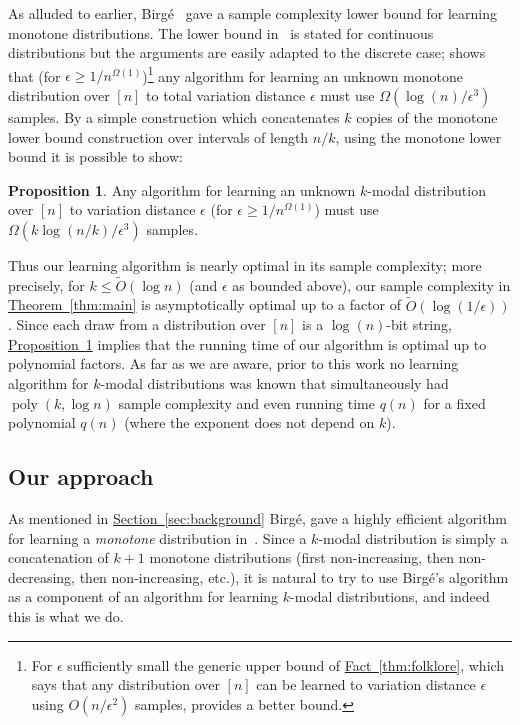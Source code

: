 \documentclass[10pt]{article}
\theoremstyle{definition}
\newtheorem{proposition}[theorem]{Proposition}
\numberwithin{equation}{section}
\newcommand{\expref}[2]{\texorpdfstring{\hyperref[#2]{#1~\ref{#2}}}{#1~\ref{#2}}}
\newcommand{\eps}{\epsilon}
\newcommand{\poly}{\operatorname{poly}}
\begin{document}
%

As alluded to earlier, Birg\'{e}~\cite{Birge:87} gave a sample complexity lower bound
for learning monotone distributions. The lower bound in~\cite{Birge:87} is stated for continuous
distributions but the arguments are easily adapted to the discrete case; \cite{Birge:87} shows that
(for $\eps \geq 1/n^{\Omega(1)}$)\footnote{For $\eps$ sufficiently small the generic
upper bound of  {\expref{Fact}{thm:folklore}}, which says that any distribution over $[n]$
can be learned to variation distance $\eps$ using $O(n/\eps^2)$ samples, provides a
better bound.} any algorithm for learning an unknown monotone distribution over $[n]$ to
total variation distance $\eps$ must use $\Omega(\log(n)/\eps^3)$ samples.
By a simple construction which concatenates $k$ copies of the monotone lower bound construction over intervals
of length $n/k$, using the monotone lower bound it is possible to show:

%

\begin{proposition} \label{obs:lowerbound}
Any algorithm for learning an unknown $k$-modal distribution over $[n]$ to variation distance
$\eps$ (for $\eps \geq 1/n^{\Omega(1)}$) must use $\Omega(k \log(n/k)/\eps^3)$ samples.
\end{proposition}

%

Thus our learning algorithm is nearly optimal in its sample complexity; more precisely,
for $k \leq \tilde{O}( {\log n})$ (and $\eps$ as bounded above), our sample complexity in \expref{Theorem}{thm:main} is asymptotically optimal up to a factor of $\tilde{O}(\log(1/\eps))$.  Since each draw
from a distribution over $[n]$ is a $\log(n)$-bit string, \expref{Proposition}{obs:lowerbound}
implies that the running time of our algorithm is optimal up to polynomial factors.  
 {As far as we are aware,} prior to this work no learning
algorithm for $k$-modal distributions was known that simultaneously had
$\poly(k,\log n)$ sample complexity  {and even running time $q(n)$ for a 
fixed polynomial $q(n)$ (where the exponent does not depend on
$k$).
}


\subsection{Our approach}

As mentioned in \expref{Section}{sec:background} Birg\'{e}, gave a highly efficient algorithm for learning a
\emph{monotone} distribution in~\cite{Birge:87b}.  Since a $k$-modal distribution is simply
a concatenation of $k+1$ monotone distributions (first non-increasing, then non-decreasing, then
non-increasing, etc.),
it is natural to try to use Birg\'{e}'s
algorithm as a component of an algorithm for learning $k$-modal distributions, and indeed this is what we do.
\end{document}
